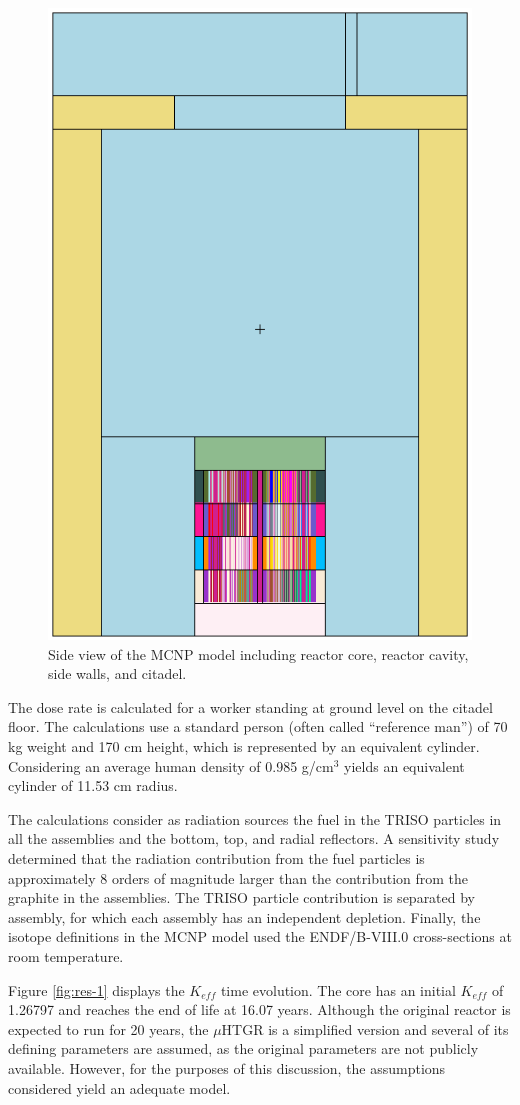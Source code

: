 \begin{figure}[htbp!]
  \begin{center}
    \includegraphics[width=0.40\linewidth]{figures/mcnp-diagram-2}
  \end{center}
  \caption{Side view of the MCNP model including reactor core, reactor cavity, side walls, and citadel.}
  \label{fig:model-2}
\end{figure}

The dose rate is calculated for a worker standing at ground level on the citadel floor.
The calculations use a standard person (often called ``reference man'') of 70 kg weight and 170 cm height, which is represented by an equivalent cylinder.
Considering an average human density of 0.985 g/cm$^3$ yields an equivalent cylinder of 11.53 cm radius.

The calculations consider as radiation sources the fuel in the TRISO particles in all the assemblies and the bottom, top, and radial reflectors.
A sensitivity study determined that the radiation contribution from the fuel particles is approximately 8 orders of magnitude larger than the contribution from the graphite in the assemblies.
The TRISO particle contribution is separated by assembly, for which each assembly has an independent depletion.
Finally, the isotope definitions in the MCNP model used the ENDF/B-VIII.0 cross-sections at room temperature.

Figure \ref{fig:res-1} displays the $K_{eff}$ time evolution.
The core has an initial $K_{eff}$ of 1.26797 and reaches the end of life at 16.07 years.
Although the original reactor is expected to run for 20 years, the $\mu$HTGR is a simplified version and several of its defining parameters are assumed, as the original parameters are not publicly available.
However, for the purposes of this discussion, the assumptions considered yield an adequate model.

